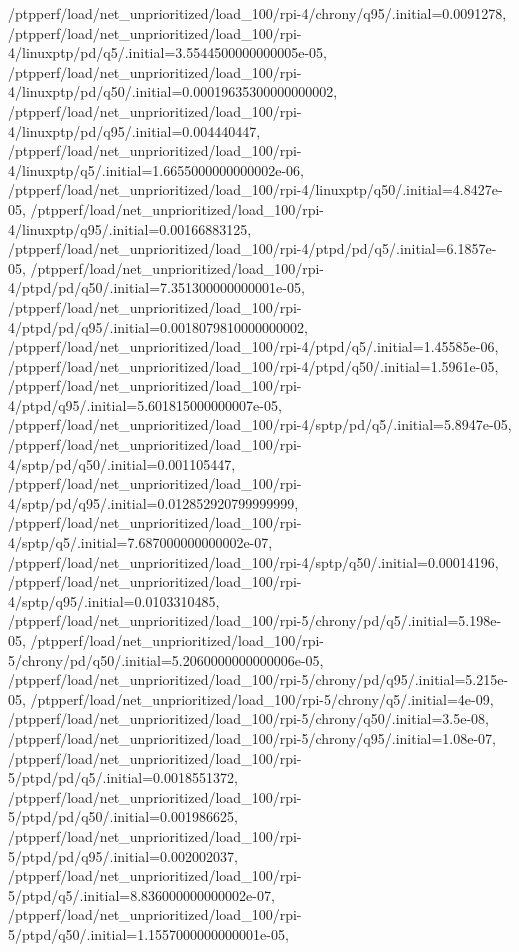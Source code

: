 {    /ptpperf/load/net_unprioritized/load_100/rpi-4/chrony/q95/.initial=0.0091278,
    /ptpperf/load/net_unprioritized/load_100/rpi-4/linuxptp/pd/q5/.initial=3.5544500000000005e-05,
    /ptpperf/load/net_unprioritized/load_100/rpi-4/linuxptp/pd/q50/.initial=0.00019635300000000002,
    /ptpperf/load/net_unprioritized/load_100/rpi-4/linuxptp/pd/q95/.initial=0.004440447,
    /ptpperf/load/net_unprioritized/load_100/rpi-4/linuxptp/q5/.initial=1.6655000000000002e-06,
    /ptpperf/load/net_unprioritized/load_100/rpi-4/linuxptp/q50/.initial=4.8427e-05,
    /ptpperf/load/net_unprioritized/load_100/rpi-4/linuxptp/q95/.initial=0.00166883125,
    /ptpperf/load/net_unprioritized/load_100/rpi-4/ptpd/pd/q5/.initial=6.1857e-05,
    /ptpperf/load/net_unprioritized/load_100/rpi-4/ptpd/pd/q50/.initial=7.351300000000001e-05,
    /ptpperf/load/net_unprioritized/load_100/rpi-4/ptpd/pd/q95/.initial=0.0018079810000000002,
    /ptpperf/load/net_unprioritized/load_100/rpi-4/ptpd/q5/.initial=1.45585e-06,
    /ptpperf/load/net_unprioritized/load_100/rpi-4/ptpd/q50/.initial=1.5961e-05,
    /ptpperf/load/net_unprioritized/load_100/rpi-4/ptpd/q95/.initial=5.601815000000007e-05,
    /ptpperf/load/net_unprioritized/load_100/rpi-4/sptp/pd/q5/.initial=5.8947e-05,
    /ptpperf/load/net_unprioritized/load_100/rpi-4/sptp/pd/q50/.initial=0.001105447,
    /ptpperf/load/net_unprioritized/load_100/rpi-4/sptp/pd/q95/.initial=0.012852920799999999,
    /ptpperf/load/net_unprioritized/load_100/rpi-4/sptp/q5/.initial=7.687000000000002e-07,
    /ptpperf/load/net_unprioritized/load_100/rpi-4/sptp/q50/.initial=0.00014196,
    /ptpperf/load/net_unprioritized/load_100/rpi-4/sptp/q95/.initial=0.0103310485,
    /ptpperf/load/net_unprioritized/load_100/rpi-5/chrony/pd/q5/.initial=5.198e-05,
    /ptpperf/load/net_unprioritized/load_100/rpi-5/chrony/pd/q50/.initial=5.2060000000000006e-05,
    /ptpperf/load/net_unprioritized/load_100/rpi-5/chrony/pd/q95/.initial=5.215e-05,
    /ptpperf/load/net_unprioritized/load_100/rpi-5/chrony/q5/.initial=4e-09,
    /ptpperf/load/net_unprioritized/load_100/rpi-5/chrony/q50/.initial=3.5e-08,
    /ptpperf/load/net_unprioritized/load_100/rpi-5/chrony/q95/.initial=1.08e-07,
    /ptpperf/load/net_unprioritized/load_100/rpi-5/ptpd/pd/q5/.initial=0.0018551372,
    /ptpperf/load/net_unprioritized/load_100/rpi-5/ptpd/pd/q50/.initial=0.001986625,
    /ptpperf/load/net_unprioritized/load_100/rpi-5/ptpd/pd/q95/.initial=0.002002037,
    /ptpperf/load/net_unprioritized/load_100/rpi-5/ptpd/q5/.initial=8.836000000000002e-07,
    /ptpperf/load/net_unprioritized/load_100/rpi-5/ptpd/q50/.initial=1.1557000000000001e-05,
}
